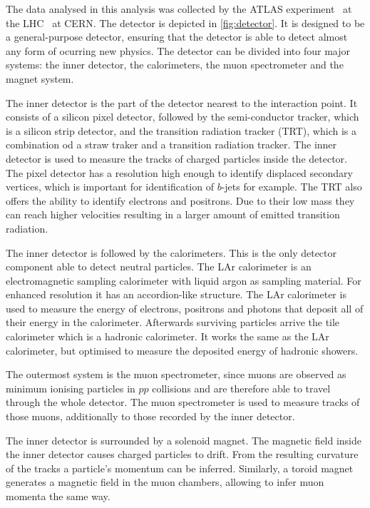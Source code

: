 The data analysed in this analysis was collected by the ATLAS experiment~\cite{ATLAS} at the LHC~\cite{LHC} at CERN. The detector is depicted in \autoref{fig:detector}. It is designed to be a general-purpose detector, ensuring that the detector is able to detect almost any form of ocurring new physics. The detector can be divided into four major systems: the inner detector, the calorimeters, the muon spectrometer and the magnet system.

The inner detector is the part of the detector nearest to the interaction point. It consists of a silicon pixel detector, followed by the semi-conductor tracker, which is a silicon strip detector, and the transition radiation tracker (TRT), which is a combination od a straw traker and a transition radiation tracker. The inner detector is used to measure the tracks of charged particles inside the detector. The pixel detector has a resolution high enough to identify displaced secondary vertices, which is important for identification of $b$-jets for example. The TRT also offers the ability to identify electrons and positrons. Due to their low mass they can reach higher velocities resulting in a larger amount of emitted transition radiation.

The inner detector is followed by the calorimeters. This is the only detector component able to detect neutral particles.
The LAr calorimeter is an electromagnetic sampling calorimeter with liquid argon as sampling material. For enhanced resolution it has an accordion-like structure. The LAr calorimeter is used to measure the energy of electrons, positrons and photons that deposit all of their energy in the calorimeter.
Afterwards surviving particles arrive the tile calorimeter which is a hadronic calorimeter. It works the same as the LAr calorimeter, but optimised to measure the deposited energy of hadronic showers.

The outermost system is the muon spectrometer, since muons are observed as minimum ionising particles in $pp$ collisions and are therefore able to travel through the whole detector. The muon spectrometer is used to measure tracks of those muons, additionally to those recorded by the inner detector.

The inner detector is surrounded by a solenoid magnet. The magnetic field inside the inner detector causes charged particles to drift. From the resulting curvature of the tracks a particle's momentum can be inferred.
Similarly, a toroid magnet generates a magnetic field in the muon chambers, allowing to infer muon momenta the same way.
